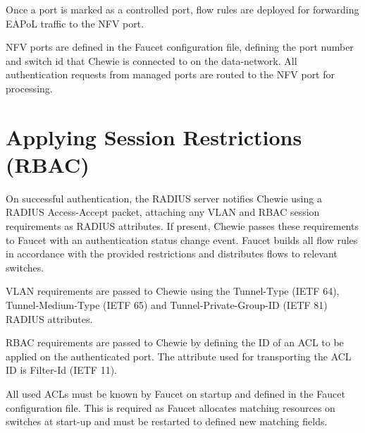 Once a port is marked as a controlled port, flow rules are deployed for forwarding EAPoL traffic to the NFV port.

NFV ports are defined in the Faucet configuration file, defining the port number and switch id that Chewie is connected to on the data-network. All authentication requests from managed ports are routed to the NFV port for processing. \cite{faucet_dot1x_docs}

\section{Applying Session Restrictions (RBAC)}
On successful authentication, the RADIUS server notifies Chewie using a RADIUS Access-Accept packet, attaching any VLAN and RBAC session requirements as RADIUS attributes. 
If present, Chewie passes these requirements to Faucet with an authentication status change event. Faucet builds all flow rules in accordance with the provided restrictions and distributes flows to relevant switches.

VLAN requirements are passed to Chewie using the Tunnel-Type (IETF 64), Tunnel-Medium-Type (IETF 65) and Tunnel-Private-Group-ID (IETF 81) RADIUS attributes.

RBAC requirements are passed to Chewie by defining the ID of an ACL to be applied on the authenticated port. The attribute used for transporting the ACL ID is Filter-Id (IETF 11).\cite{faucet_dot1x_docs}

All used ACLs must be known by Faucet on startup and defined in the Faucet configuration file. This is required as Faucet allocates matching resources on switches at start-up and must be restarted to defined new matching fields.